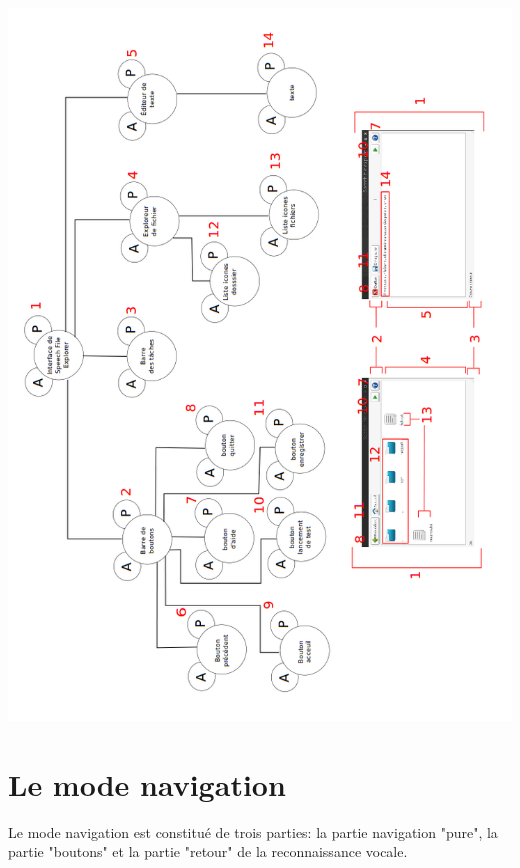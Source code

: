 \documentclass[a4paper, 11pt]{report}
\begin{document}
	\begin{center}
		\includegraphics[width=14cm]{swag}
	\end{center}
	
	\section{Le mode navigation}
	
	Le mode navigation est constitué de trois parties: la partie navigation "pure", la partie "boutons" et la partie "retour" de la reconnaissance vocale.\\
	
\end{document}
